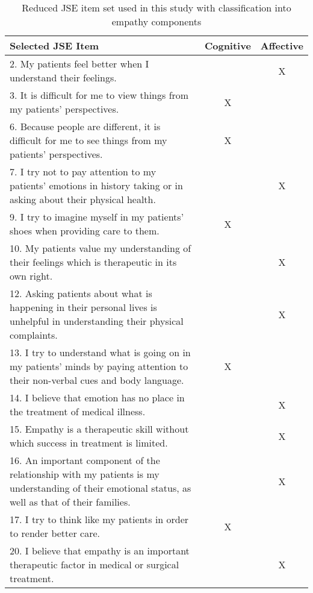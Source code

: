 \begin{table}[H]
    \centering
    \begin{tabular}{p{10.5cm}cc}
    \toprule
    \textbf{Selected JSE Item} & \textbf{Cognitive} & \textbf{Affective} \\
    \midrule
    2. My patients feel better when I understand their feelings. & & X \\
    3. It is difficult for me to view things from my patients’ perspectives. & X & \\
    6. Because people are different, it is difficult for me to see things from my patients’ perspectives. & X & \\
    7. I try not to pay attention to my patients’ emotions in history taking or in asking about their physical health. & & X \\
    9. I try to imagine myself in my patients’ shoes when providing care to them. & X & \\
    10. My patients value my understanding of their feelings which is therapeutic in its own right. & & X \\
    12. Asking patients about what is happening in their personal lives is unhelpful in understanding their physical complaints. & & X \\
    13. I try to understand what is going on in my patients’ minds by paying attention to their non-verbal cues and body language. & X & \\
    14. I believe that emotion has no place in the treatment of medical illness. & & X \\
    15. Empathy is a therapeutic skill without which success in treatment is limited. & & X \\
    16. An important component of the relationship with my patients is my understanding of their emotional status, as well as that of their families. & & X \\
    17. I try to think like my patients in order to render better care. & X & \\
    20. I believe that empathy is an important therapeutic factor in medical or surgical treatment. & & X \\
    \bottomrule
    \end{tabular}
    \caption{Reduced JSE item set used in this study with classification into empathy components}
    \label{tab:jse_shortened}
    \end{table}